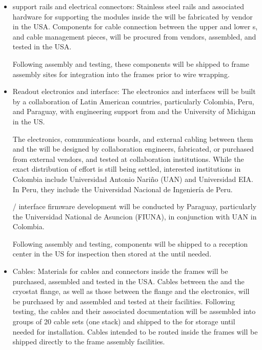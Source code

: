 \begin{itemize}
\item {} support rails and electrical connectors:  Stainless steel rails and associated hardware for supporting the  modules inside the  will be fabricated by vendor in the USA.  Components for cable connection between the upper and lower s, and cable management pieces, will be procured from vendors, assembled, and tested in the USA.  

Following assembly and testing, these components will be shipped to  frame assembly sites for integration into the frames prior to wire wrapping.

\item Readout electronics and  interface:  The  electronics and  interfaces will be built by a collaboration of Latin American countries, particularly Colombia, Peru, and Paraguay, with engineering support from  and the University of Michigan in the US. 

The  electronics, communications boards, and external cabling between them and the  will be designed by collaboration engineers, fabricated, or purchased from external vendors, and tested at collaboration institutions.  While the exact distribution of effort is still being settled, interested institutions in Colombia include Universidad  Antonio Nari\~no (UAN) and Universidad EIA.  In Peru, they include the Universidad Nacional de Ingenier\'ia de Peru.

/ interface firmware development will be conducted by Paraguay, particularly the Universidad National de Asuncion (FIUNA), in conjunction with UAN in Colombia.

Following assembly and testing, components will be shipped to a reception center in the US for inspection then stored at the  until needed.

\item Cables:  Materials for cables and connectors inside the  frames will be purchased, assembled and tested in the USA.  Cables between the  and the cryostat flange, as well as those between the flange and the  electronics, will be purchased by  and assembled and tested at their facilities.
Following testing, the cables and their associated  documentation will be assembled into groups of 20 cable sets (one  stack) and shipped to the  for storage until needed for installation.  Cables intended to be routed inside the  frames will be shipped directly to the  frame assembly facilities.


\end{itemize}
